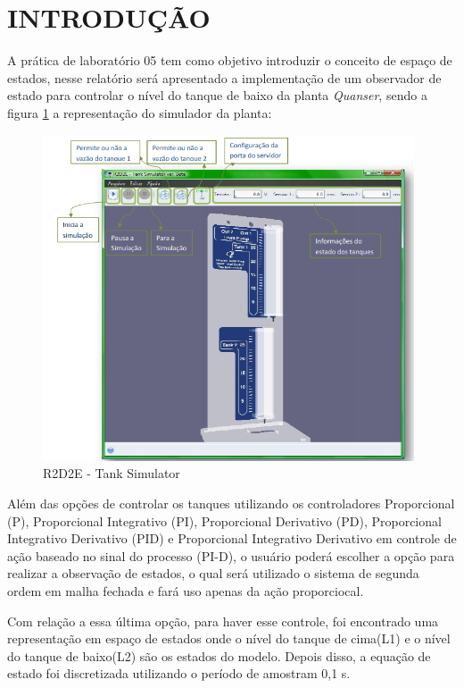 \documentclass[a4paper,12pt]{article}
\begin{document}

\thispagestyle{main}

\section{INTRODUÇÃO}

\hspace{4ex}A prática de laboratório 05 tem como objetivo introduzir o conceito de espaço de estados, nesse relatório será apresentado a implementação de um observador de estado para controlar o nível do tanque de baixo da planta \textit{Quanser}, sendo a figura \ref{r2d2e} a representação do simulador da planta:

\begin{figure}[H]
\centering
\includegraphics[width=11cm]{ImagensLab4/simulator.png}
\caption{R2D2E - Tank Simulator}
\label{r2d2e}
\end{figure}

\hspace{4ex}Além das opções de controlar os tanques utilizando os controladores Proporcional (P), Proporcional Integrativo (PI), Proporcional Derivativo (PD), Proporcional Integrativo Derivativo (PID) e Proporcional Integrativo Derivativo em controle de ação baseado no sinal do processo (PI-D), o usuário poderá escolher a opção para realizar a observação de estados, o qual será utilizado o sistema de segunda ordem em malha fechada e fará uso apenas da ação proporciocal. 

\hspace{4ex}Com relação a essa última opção, para haver esse controle, foi encontrado uma representação em espaço de estados onde o nível do tanque de cima(L1) e o nível do tanque de baixo(L2) são os estados do modelo. Depois disso, a equação de estado foi discretizada utilizando o período de amostram 0,1 s.
\end{document}
